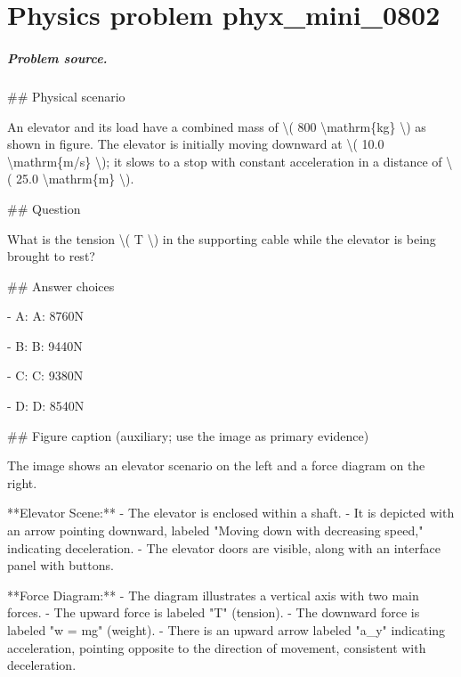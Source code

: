 
\chapter{Physics problem phyx\_mini\_0802}
\label{ch:PhyXMiniProblems_problem_phyx_mini_0802}

\paragraph{Problem source.}
\#\# Physical scenario

An elevator and its load have a combined mass of \textbackslash{}( 800 \textbackslash{}mathrm\{kg\} \textbackslash{}) as shown in figure. The elevator is initially moving downward at \textbackslash{}( 10.0 \textbackslash{}mathrm\{m/s\} \textbackslash{}); it slows to a stop with constant acceleration in a distance of \textbackslash{}( 25.0 \textbackslash{}mathrm\{m\} \textbackslash{}).

\#\# Question

What is the tension \textbackslash{}( T \textbackslash{}) in the supporting cable while the elevator is being brought to rest?

\#\# Answer choices

- A: A: 8760N

- B: B: 9440N

- C: C: 9380N

- D: D: 8540N

\#\# Figure caption (auxiliary; use the image as primary evidence)

The image shows an elevator scenario on the left and a force diagram on the right. 

**Elevator Scene:**
- The elevator is enclosed within a shaft.
- It is depicted with an arrow pointing downward, labeled "Moving down with decreasing speed," indicating deceleration.
- The elevator doors are visible, along with an interface panel with buttons.

**Force Diagram:**
- The diagram illustrates a vertical axis with two main forces.
- The upward force is labeled "T" (tension).
- The downward force is labeled "w = mg" (weight).
- There is an upward arrow labeled "a\_y" indicating acceleration, pointing opposite to the direction of movement, consistent with deceleration.
  
